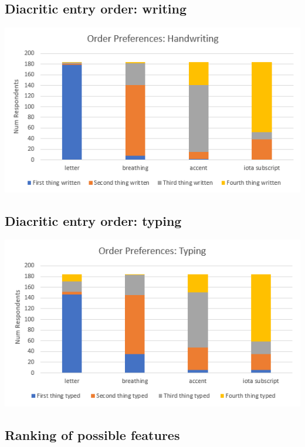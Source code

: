 \documentclass[11pt]{article}
\begin{document}
\subsection{Diacritic entry order: writing}
\label{sec:orge7dfdbb}

\begin{center}
\includegraphics[width=.9\linewidth]{./images/diacritic-entry-order-writing.PNG}
\end{center}

\subsection{Diacritic entry order: typing}
\label{sec:orgec462ab}

\begin{center}
\includegraphics[width=.9\linewidth]{./images/diacritic-entry-order-typing.PNG}
\end{center}

\subsection{Ranking of possible features}
\label{sec:orgb39db60}
\end{document}
